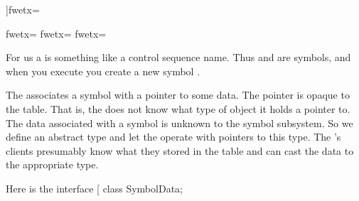 ]fwetx=%
\fwcdef 
\fwbeginmacronotes
{}
\fwendmacronotes
\fwendmacro


\fwbeginmacro
{}\fwequals \fwodef {}fwetx=%
\fwbtx[
]fwetx=%
\fwoparen \fwoquote{}\fwcquote\fwcomma \fwoquote{}\fwcquote\fwcparen \fwbtx[
]fwetx=%
\fwcdef 
\fwbeginmacronotes
{}
\fwendmacronotes
\fwendmacro






For us a  is something like a control sequence name.  Thus
 and  are symbols, and when you execute
 you create a new symbol .

The  associates a symbol with a pointer to some
data. The pointer is opaque to the table. That is, the 
does not know what type of object it holds a pointer to.  The data
associated with a symbol is unknown to the symbol subsystem.  So we
define an abstract type  and let the 
operate with pointers to this type. The 's clients
presumably know what they stored in the table and can cast the data to
the appropriate type.


Here is the interface
\fwbeginmacro
{}\fwequals \fwodef \fwbtx[
class SymbolData;

